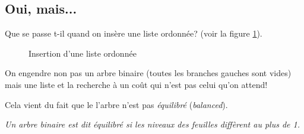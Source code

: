 \subsection{Oui, mais...}
Que se passe t-il quand on insère une liste ordonnée? (voir la figure
\ref{ordo}). 
\begin{figure}
\caption{Insertion d'une liste ordonnée}
\label{ordo}
\end{figure}
On engendre non pas un arbre binaire (toutes les branches gauches sont
vides) mais une liste et la recherche à un coût qui n'est pas celui
qu'on attend!

Cela vient du fait que le l'arbre n'est pas \emph{équilibré} (\emph{balanced}).

\emph{Un arbre binaire est dit équilibré si les niveaux des feuilles
  diffèrent au plus de 1.}

